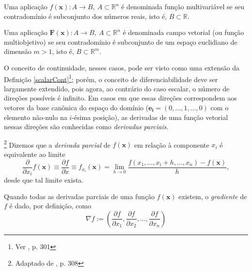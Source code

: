 \begin{definition}
Uma aplica\c{c}\~{a}o $f(\mathbf{x}): A \to B,~ A \subset \mathbb{R}^{n}$ \'{e} denominada fun\c{c}\~{a}o multivari\'{a}vel se seu contradom\'{i}nio \'{e} subconjunto dos n\'{u}meros reais, isto \'{e}, $B \subset \mathbb{R}$.
\end{definition}

\begin{definition}
Uma aplica\c{c}\~{a}o $\mathbf{F}(\mathbf{x}): A \to B,~ A \subset \mathbb{R}^{n}$ \'{e} denominada campo vetorial (ou fun\c{c}\~{a}o multiobjetivo) se seu contradom\'{i}nio \'{e} subconjunto de um espa\c{c}o euclidiano de dimens\~{a}o $m > 1$, isto \'{e}, $B \subset \mathbb{R}^{m}$.
\end{definition}

O conceito de continuidade, nesses casos, pode ser visto como uma extens\~{a}o da Defini\c{c}\~{a}o \ref{scalarCont}\footnote{Ver \cite{thomas2}, p. 301}; por\'{e}m, o conceito de diferenciabilidade deve ser largamente extendido, pois agora, ao contr\'{a}rio do caso escalar, o n\'{u}mero de dire\c{c}\~{o}es poss\'{i}veis \'{e} infinito. Em casos em que essas dire\c{c}\~{o}es correspondem aos vetores da base can\^{o}nica do espa\c{c}o do dom\'{i}nio ($\mathbf{e_i} = (0,...,1,...,0)$ com o elemento n\~{a}o-nulo na $i$-\'{e}sima posi\c{c}\~{a}o), as derivadas de uma fun\c{c}\~{a}o vetorial nessas dire\c{c}\~{o}es s\~{a}o conhecidas como \textit{derivadas parciais}.

\begin{definition}\footnote{Adaptado de \cite{thomas2}, p. 308}
Dizemos que a \textit{derivada parcial} de $f(\mathbf{x})$ em rela\c{c}\~{a}o \`{a} componente $x_i$ \'{e} equivalente ao limite
\begin{equation}
\frac{\partial}{\partial x_i}f(\mathbf{x}) \equiv \frac{\partial f}{\partial x} \equiv f_{x_i}(\mathbf{x}) = \lim_{h \to 0} \frac{f(x_1,...,x_i + h,...,x_n)-f(\mathbf{x})}{h},
\end{equation}
desde que tal limite exista.
\end{definition}

Quando todas as derivadas parciais de uma fun\c{c}\~{a}o $f(\mathbf{x})$ existem, o \textit{gradiente} de $f$ \'{e} dado, por defini\c{c}\~{a}o, como
\begin{equation}
\nabla f := (\frac{\partial f}{\partial x_1},\frac{\partial f}{\partial x_2},...,\frac{\partial f}{\partial x_n})
\end{equation}

